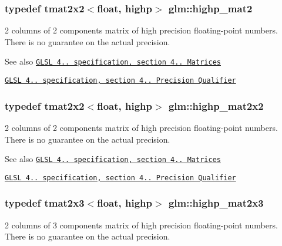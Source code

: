 \subsubsection[{highp\+\_\+mat2}]{\setlength{\rightskip}{0pt plus 5cm}typedef tmat2x2$<$float, highp$>$ {\bf glm\+::highp\+\_\+mat2}}\label{namespaceglm_ac77ecf54fde34e33f934c6876ad807b3}
2 columns of 2 components matrix of high precision floating-\/point numbers. There is no guarantee on the actual precision.

\begin{DoxySeeAlso}{See also}
\href{http://www.opengl.org/registry/doc/GLSLangSpec.4.20.8.pdf}{\tt G\+L\+S\+L 4.. specification, section 4.. Matrices} 

\href{http://www.opengl.org/registry/doc/GLSLangSpec.4.20.8.pdf}{\tt G\+L\+S\+L 4.. specification, section 4.. Precision Qualifier} 
\end{DoxySeeAlso}
\hypertarget{namespaceglm_a2819dad225ade63363e44d40b9935532}{}
\subsubsection[{highp\+\_\+mat2x2}]{\setlength{\rightskip}{0pt plus 5cm}typedef tmat2x2$<$float, highp$>$ {\bf glm\+::highp\+\_\+mat2x2}}\label{namespaceglm_a2819dad225ade63363e44d40b9935532}
2 columns of 2 components matrix of high precision floating-\/point numbers. There is no guarantee on the actual precision.

\begin{DoxySeeAlso}{See also}
\href{http://www.opengl.org/registry/doc/GLSLangSpec.4.20.8.pdf}{\tt G\+L\+S\+L 4.. specification, section 4.. Matrices} 

\href{http://www.opengl.org/registry/doc/GLSLangSpec.4.20.8.pdf}{\tt G\+L\+S\+L 4.. specification, section 4.. Precision Qualifier} 
\end{DoxySeeAlso}
\hypertarget{namespaceglm_a5fd3b253d3fb12f78e286a7d90905631}{}
\subsubsection[{highp\+\_\+mat2x3}]{\setlength{\rightskip}{0pt plus 5cm}typedef tmat2x3$<$float, highp$>$ {\bf glm\+::highp\+\_\+mat2x3}}\label{namespaceglm_a5fd3b253d3fb12f78e286a7d90905631}
2 columns of 3 components matrix of high precision floating-\/point numbers. There is no guarantee on the actual precision.

